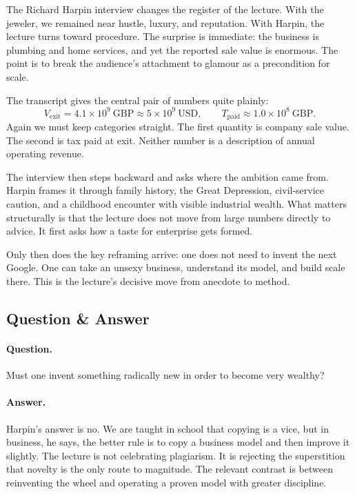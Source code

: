 The Richard Harpin interview changes the register of the lecture. With the jeweler, we remained near hustle, luxury, and reputation. With Harpin, the lecture turns toward procedure. The surprise is immediate: the business is plumbing and home services, and yet the reported sale value is enormous. The point is to break the audience's attachment to glamour as a precondition for scale.

The transcript gives the central pair of numbers quite plainly:
\begin{equation}
V_{\mathrm{exit}} = 4.1\times 10^{9}\ \mathrm{GBP}
\approx 5\times 10^{9}\ \mathrm{USD},
\qquad
T_{\mathrm{paid}} \approx 1.0\times 10^{8}\ \mathrm{GBP}.
\end{equation}
Again we must keep categories straight. The first quantity is company sale value. The second is tax paid at exit. Neither number is a description of annual operating revenue.

The interview then steps backward and asks where the ambition came from. Harpin frames it through family history, the Great Depression, civil-service caution, and a childhood encounter with visible industrial wealth. What matters structurally is that the lecture does not move from large numbers directly to advice. It first asks how a taste for enterprise gets formed.

Only then does the key reframing arrive: one does not need to invent the next Google. One can take an unsexy business, understand its model, and build scale there. This is the lecture's decisive move from anecdote to method.

\subsection{Question \& Answer}

\paragraph{Question.} Must one invent something radically new in order to become very wealthy?

\paragraph{Answer.} Harpin's answer is no. We are taught in school that copying is a vice, but in business, he says, the better rule is to copy a business model and then improve it slightly. The lecture is not celebrating plagiarism. It is rejecting the superstition that novelty is the only route to magnitude. The relevant contrast is between reinventing the wheel and operating a proven model with greater discipline.

